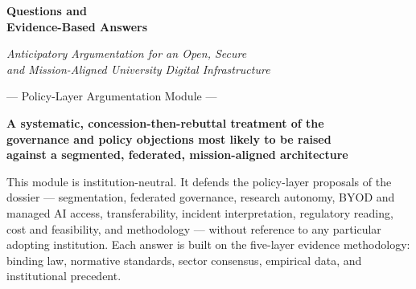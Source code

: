 

\begin{titlepage}
\centering
\vspace*{0.6cm}

{\suittitlelogo}

\vspace{0.8cm}

{\Huge\bfseries Questions and\\[0.25cm] Evidence-Based Answers}

\vspace{0.6cm}

{\LARGE\itshape Anticipatory Argumentation for an Open, Secure\\and Mission-Aligned University Digital Infrastructure}

\vspace{1cm}

{\large --- Policy-Layer Argumentation Module ---}

\vspace{0.5cm}

\suitmetablock

\vspace{0.8cm}

\begin{tcolorbox}[
    colback=NavyBlue!8!white,
    colframe=NavyBlue!85!black,
    boxrule=1.2pt,
    arc=3pt,
    left=12pt, right=12pt, top=8pt, bottom=8pt,
    width=0.88\textwidth,
    halign=center
]
{\large\bfseries A systematic, concession-then-rebuttal treatment of the\\[4pt]
governance and policy objections most likely to be raised\\[4pt]
against a segmented, federated, mission-aligned architecture}
\end{tcolorbox}

\vspace{0.6cm}

{\small\noindent This module is institution-neutral. It defends the policy-layer
proposals of the dossier --- segmentation, federated governance, research
autonomy, BYOD and managed AI access, transferability, incident
interpretation, regulatory reading, cost and feasibility, and methodology ---
without reference to any particular adopting institution. Each answer is built
on the five-layer evidence methodology: binding law, normative standards,
sector consensus, empirical data, and institutional precedent.}\par


\end{titlepage}
